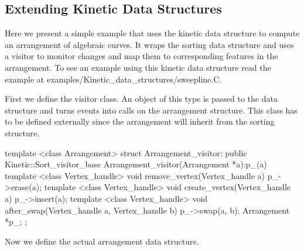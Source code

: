 

\subsection{Extending Kinetic Data Structures\label{sec:kds_sweepline_example}}


Here we present a simple example that uses the
 kinetic data structure to compute
an arrangement of algebraic curves. It wraps the sorting data
structure and uses a visitor to monitor changes and map them to
corresponding features in the arrangement. To see an example using
this kinetic data structure read the example at
examples/Kinetic\_data\_structures/sweepline.C.

First we define the visitor class. An object of this type is passed to
the  data structure and turns
events into calls on the arrangement structure. This class has to be
defined externally since the arrangement will inherit from the sorting
structure.

\begin{ccExampleCode}
template <class Arrangement>
struct Arrangement_visitor: public Kinetic::Sort_visitor_base
{
  Arrangement_visitor(Arrangement *a):p_(a){}
  template <class Vertex_handle>
  void remove_vertex(Vertex_handle a) {
    p_->erase(a);
  }
  template <class Vertex_handle>
  void create_vertex(Vertex_handle a) {
    p_->insert(a);
  }
  template <class Vertex_handle>
  void after_swap(Vertex_handle a, Vertex_handle b) {
    p_->swap(a, b);
  }
  Arrangement *p_;
};

\end{ccExampleCode}

Now we define the actual arrangement data structure. 

